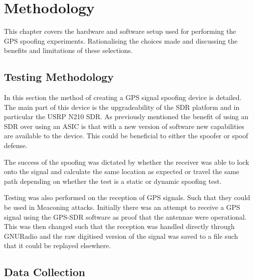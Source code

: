 \chapter{Methodology} %

\label{Chapter4} %

This chapter covers the hardware and software setup used for performing the GPS spoofing experiments. Rationalising the choices made and discussing the benefits and
limitations of these selections.


\section{Testing Methodology}

In this section the method of creating a GPS signal spoofing device is detailed. The main part of this device is the upgradeability of the SDR platform
and in particular the USRP N210 SDR. As previously mentioned the benefit of using an SDR over using an ASIC is that with a new version of software 
new capabilities are available to the device. This could be beneficial to either the spoofer or spoof defense. 

The success of the spoofing was dictated by whether the receiver was able to lock onto the signal and calculate the same location as expected or travel the same path
depending on whether the test is a static or dynamic spoofing test. 

Testing was also performed on the reception of GPS signals. Such that they could be used in Meaconing attacks. Initially there was an attempt to receive a GPS signal using
the GPS-SDR software as proof that the antennae were operational. This was then changed such that the reception was handled directly through GNURadio and the raw
digitised version of the signal was saved to a file such that it could be replayed elsewhere.


\section{Data Collection}

